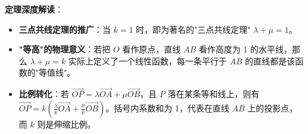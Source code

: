 \begin{explanationbox}
\textbf{定理深度解读}：
\begin{itemize}
    \item \textbf{三点共线定理的推广}：当 $k=1$ 时，即为著名的"三点共线定理" $\lambda + \mu = 1$。
    \item \textbf{"等高"的物理意义}：若把 $O$ 看作原点，直线 $AB$ 看作高度为 1 的水平线，那么 $\lambda + \mu = k$ 实际上定义了一个线性函数，每一条平行于 $AB$ 的直线都是该函数的"等值线"。
    \item \textbf{比例转化}：若 $\vec{OP} = \lambda\vec{OA} + \mu\vec{OB}$，且 $P$ 落在某条等和线上，则有 $\vec{OP} = k \left( \frac{\lambda}{k}\vec{OA} + \frac{\mu}{k}\vec{OB} \right)$。括号内系数和为 1，代表在直线 $AB$ 上的投影点，而 $k$ 则是伸缩比例。
\end{itemize}
\end{explanationbox}